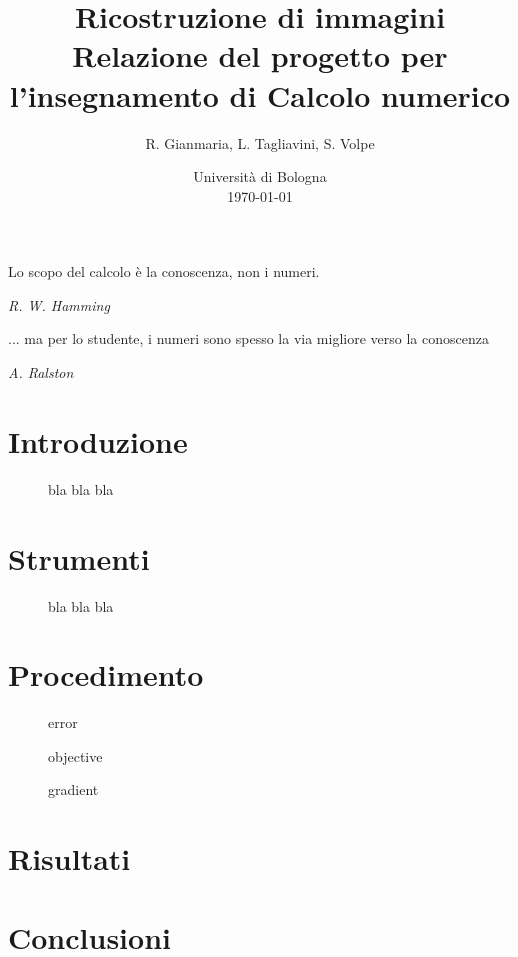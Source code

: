 \documentclass[a4paper]{article}
\title{Ricostruzione di immagini \\ \large Relazione del progetto per l'insegnamento di Calcolo numerico}
\author{
  R. Gianmaria,
  L. Tagliavini,
  S. Volpe
}
\date{
	Universit\`a di Bologna \\
  \today
}
\begin{document}
\maketitle
\thispagestyle{empty}

\epigraph{Lo scopo del calcolo è la conoscenza, non i numeri.}
{\textit{R. W. Hamming}}
\epigraph{... ma per lo studente, i numeri sono spesso la via migliore verso la
conoscenza}
{\textit{A. Ralston}}

\section{Introduzione}

\begin{figure}
    \begin{center}
        \scalebox{0.65}{}
    \end{center}
    \caption{bla bla bla}
\end{figure}

\section{Strumenti}

\begin{figure}
    \begin{center}
        \scalebox{0.65}{}
    \end{center}
    \begin{center}
        \scalebox{0.65}{}
    \end{center}
    \begin{center}
      \scalebox{0.65}{}
    \end{center}
    \caption{bla bla bla}
\end{figure}

\section{Procedimento}

\begin{figure}
    \begin{center}
        \scalebox{0.65}{}
    \end{center}
    \caption{error}
\end{figure}

\begin{figure}
    \begin{center}
        \scalebox{0.65}{}
    \end{center}
    \caption{objective}
\end{figure}

\begin{figure}
    \begin{center}
        \scalebox{0.65}{}
    \end{center}
    \caption{gradient}
\end{figure}

\section{Risultati}

\section{Conclusioni}
\end{document}
